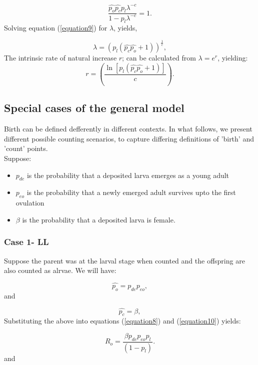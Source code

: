 \documentclass[10pt,a4paper]{article}
\begin{document}
\begin{equation}
\label{equation9} 
\frac{\hat{p_o}\hat{p_c}p_l\lambda^{-c}}{1-p_l\lambda^{-c}} =1.
\end{equation}
Solving equation (\ref{equation9}) for $\lambda$, yields, 

\begin{equation}
\label{equation10} 
\lambda =(p_l(\hat{p_c}\hat{p_o}+1))^\frac{1}{c},
\end{equation}
The intrinsic rate of natural increase $r$; can be calculated from $\lambda = e^r$, yielding: 
\begin{equation}
\label{equation13} 
r = (\frac{\ln[p_l(\hat{p_c}\hat{p_o}+1)]}{c}).
\end{equation}


\subsection*{Special cases of the general model}

Birth can be defined defferently in different contexts.  In what follows, we present different possible counting scenarios, to capture differing definitions of 'birth' and 'count' points. \\ Suppose:\\
\begin{itemize}
	\item $p_{de}$ is the probability that a deposited larva emerges as a young adult
	\item $p_{eo}$ is the probability that a newly emerged adult survives upto the first ovulation
	\item  $\beta$ is the probability that a deposited larva is female.
\end{itemize}
 
 
  
  
\subsubsection*{Case 1- LL}

Suppose the parent was at the larval stage when counted and the offspring are also counted as alrvae. We will have:

$$\hat{p_o}= p_{de}p_{eo},$$ and 

$$\hat{p_c}= \beta,$$ Substituting the above into equations (\ref{equation8}) and (\ref{equation10}) yields:

\begin{equation}
\label{equation88} 
R_o =\frac{\beta p_{de}p_{eo}p_l}{(1-p_l)}.
\end{equation} and 
\end{document}
